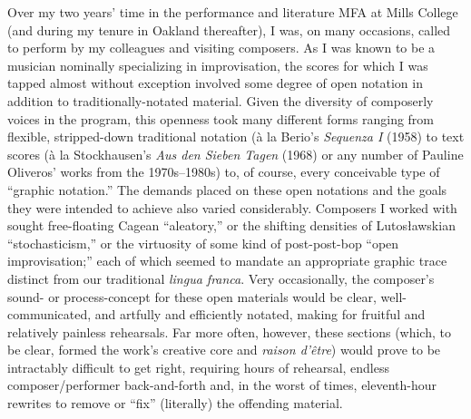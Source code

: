     Over my two years' time in the performance and literature MFA at Mills College (and during my tenure in Oakland thereafter), I was, on many occasions, called to perform by my colleagues and visiting composers. As I was known to be a musician nominally specializing in improvisation, the scores for which I was tapped almost without exception involved some degree of open notation in addition to traditionally-notated material. Given the diversity of composerly voices in the program, this openness took many different forms ranging from flexible, stripped-down traditional notation (à la Berio's \textit{Sequenza I} (1958) to text scores (à la Stockhausen's \textit{Aus den Sieben Tagen} (1968) or any number of Pauline Oliveros' works from the 1970s--1980s) to, of course, every conceivable type of ``graphic notation.'' The demands placed on these open notations and the goals they were intended to achieve also varied considerably. Composers I worked with sought free-floating Cagean ``aleatory,'' or the shifting densities of Lutosławskian ``stochasticism,'' or the virtuosity of some kind of post-post-bop ``open improvisation;'' each of which seemed to mandate an appropriate graphic trace distinct from our traditional \textit{lingua franca}. Very occasionally, the composer's sound- or process-concept for these open materials would be clear, well-communicated, and artfully and efficiently notated, making for fruitful and relatively painless rehearsals. Far more often, however, these sections (which, to be clear, formed the work's creative core and \textit{raison d'\^{e}tre}) would prove to be intractably difficult to get right, requiring hours of rehearsal, endless composer/performer back-and-forth and, in the worst of times, eleventh-hour rewrites to remove or ``fix'' (literally) the offending material. 
    
